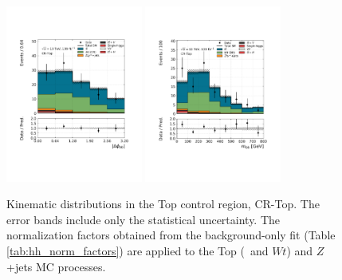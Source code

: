 \begin{figure}[!htb]
    \includegraphics[width=0.4\textwidth]{figures/search_hh/bkg_estimate/crvr/crtop/crtoptest_dphi_bb}
    \includegraphics[width=0.4\textwidth]{figures/search_hh/bkg_estimate/crvr/crtop/crtoptest_mbb}
    \caption{
    Kinematic distributions in the Top control region, CR-Top.
    The error bands include only the statistical uncertainty.
    The normalization factors obtained from the background-only fit (Table \ref{tab:hh_norm_factors}) are applied
    to the Top (\ttbar~and $Wt$) and $Z$+jets MC processes.
    }
    \label{fig:crtop_kin_plots_1}
\end{figure}
